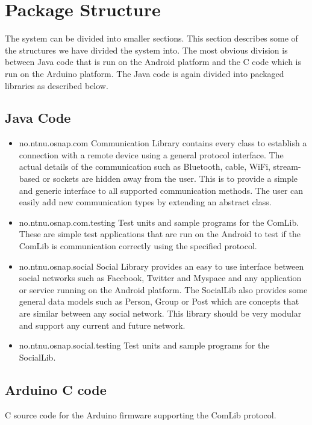 \section{Package Structure}
The system can be divided into smaller sections. This section describes some of the structures we have divided the system into. The most obvious division is between Java code that is
run on the Android platform and the C code which is run on the Arduino platform. The Java code is again divided into packaged libraries as described below.

\subsection{Java Code}
\begin{itemize}
\item{no.ntnu.osnap.com}  \newline
Communication Library contains every class to establish a connection with a remote device using a general protocol interface. The actual details of the communication such as
Bluetooth, cable, WiFi, stream-based or sockets are hidden away from the user. This is to provide a simple and generic interface to all supported communication methods. The
user can easily add new communication types by extending an abstract class.
\item{no.ntnu.osnap.com.testing}  \newline
Test units and sample programs for the ComLib. These are simple test applications that are run on the Android to test if the ComLib is communication correctly using the specified
protocol.
\item{no.ntnu.osnap.social}  \newline
Social Library provides an easy to use interface between social networks such as Facebook, Twitter and Myspace and any application or service running on the Android platform.
The SocialLib also provides some general data models such as Person, Group or Post which are concepts that are similar between any social network. This library should be very modular
and support any current and future network.
\item{no.ntnu.osnap.social.testing}  \newline
Test units and sample programs for the SocialLib.
\end{itemize}

\subsection{Arduino C code}
C source code for the Arduino firmware supporting the ComLib protocol.

